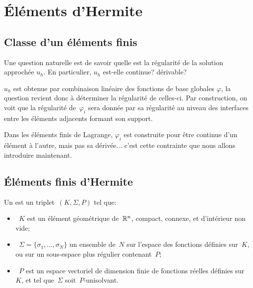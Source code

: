 \medskip
\section{Éléments d'Hermite}

\medskip
\subsection{Classe d'un éléments finis}

Une question naturelle est de savoir quelle est la régularité de la solution approchée
$u_h$. En particulier, $u_h$ est-elle continue? dérivable?

$u_h$ est obtenue par combinaison linéaire des fonctions de base globales
$\varphi$, la question revient donc à déterminer la régularité de celles-ci.
Par construction, on voit que la régularité de~$\varphi_i$ sera donnée par sa
régularité au niveau des interfaces entre les éléments adjacents formant
son support.

Dans les éléments finis de Lagrange, $\varphi_i$ est construite pour être continue
d'un élément à l'autre, mais pas sa dérivée... c'est cette contrainte que
nous allons introduire maintenant.


\medskip
\subsection{Éléments finis d'Hermite}

\begin{definition}
Un  est un
triplet~$(K, \Sigma, P)$ tel que:
\begin{itemize}
\item~$K$ est un élément géométrique de~$\mathbb R^n$, compact, connexe, et d'intérieur
	non vide;
\item~$\Sigma=\{\sigma_1,\ldots, \sigma_N\}$ un ensemble de~$N$ 
	sur l'espace des fonctions définies sur~$K$, ou sur un sous-espace plus régulier contenant~$P$;
\item~$P$ est un espace vectoriel de dimension finie de fonctions réelles définies sur~$K$, et tel
	que~$\Sigma$ soit~$P$-unisolvant.
\end{itemize}
\end{definition}

